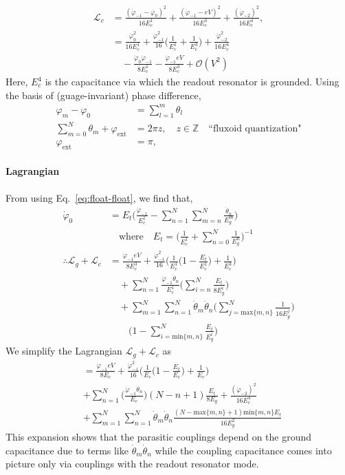 \documentclass[%
reprint,
superscriptaddress,
 amsmath,amssymb,
 aps,
 prx,
longbibliography,
floatfix,
]{revtex4-2}
\begin{document}
\begin{align}
\mathcal{L}_{c}&=\frac{(\dot{\varphi}_{-1}-\dot{\varphi_0})^2}{16E^1_{c}}+\frac{(\dot{\varphi}_{-1}-eV)^2}{16E^3_{c}}+\frac{(\dot{\varphi}_{-2})^2}{16E^4_{c}},\\ &=\frac{\dot{\varphi}^2_0}{16E^1_c}+\frac{\dot{\varphi}^2_{-1}}{16}\Big(\frac{1}{E^1_c}+\frac{1}{E^3_c}\Big)+\frac{\dot{\varphi}^2_{-2}}{16E^4_c}\nonumber\\&\quad-\frac{\dot{\varphi}_0\dot{\varphi}_{-1}}{8E^1_c}-\frac{\dot{\varphi}_{-1}eV}{8E^3_c}+\mathcal{O}(V^2)
\end{align}
Here, $E_c^4$ is the capacitance via which the readout resonator is grounded. Using the basis of (guage-invariant) phase difference, 
\begin{align}
\varphi_m-\varphi_0&=\sum_{l=1}^m\theta_l\\ \sum_{m=0}^N \theta_m+\varphi_\mathrm{ext}&=2\pi z, \quad z\in\mathbb{Z}\quad\text{``fluxoid quantization"}\\
\varphi_\mathrm{ext}&=\pi,    
\end{align}
\paragraph{Lagrangian} 
From using Eq.~\ref{eq:float-float}, we find that, 
\begin{align}
    \dot{\varphi}_0&=E_t\Big(\frac{\dot{\varphi}_{-1}}{E_c^1}-\sum_{n=1}^N\sum_{m=n}^N\frac{\dot{\theta}_n}{E^m_g}\Big)\\&\quad\text{where}\quad E_t=\Big(\frac{1}{E_c^1}+\sum_{n=0}^N\frac{1}{E^n_g}\Big)^{-1}\nonumber\\
\therefore     \mathcal{L}_g+\mathcal{L}_c&=\frac{\dot{\varphi}_{-1}eV}{8E^3_c}+\frac{\dot{\varphi}^2_{-1}}{16}\Big(\frac{1}{E^1_c}\Big(1-\frac{E_t}{E_c^1}\Big)+\frac{1}{E^3_c}\Big)\nonumber\\&\quad+\sum_{n=1}^N\frac{\dot{\varphi}_{-1}\dot{\theta}_n}{E_c^1}\Big(\sum_{i=n}^N\frac{E_t}{8E^i_g}\Big)\nonumber\\&\quad+\sum_{m=1}^N\sum_{n=1}^N\dot{\theta}_m\dot{\theta}_{n}\Big( \sum_{j=\text{max}\{m,n\}}^N\frac{1}{16E_g^j}\Big)\nonumber\\&\quad\quad\Big(1-\sum_{i=\text{min}\{m,n\}}^N\frac{E_t}{E_g^i}\Big)
\end{align}
We simplify the Lagrangian $\mathcal{L}_g+\mathcal{L}_c$ as
\begin{align}
    &=\frac{\dot{\varphi}_{-1}eV}{8E_c}+\frac{\dot{\varphi}^2_{-1}}{16}\Big(\frac{1}{E_c}\Big(1-\frac{E_t}{E_c}\Big)+\frac{1}{E_c}\Big)\nonumber\\&+\sum_{n=1}^N\Big(\frac{\dot{\varphi}_{-1}\dot{\theta}_n}{E_c}\Big)(N-n+1)\frac{E_t}{8E_g}+\frac{(\dot{\varphi}_{-2})^2}{16E^4_{c}}\nonumber\\
&+\sum_{m=1}^N\sum_{n=1}^N\dot{\theta}_m\dot{\theta}_{n} \frac{(N-\text{max}\{m,n\}+1)\text{min}\{m,n\}E_t}{16E_g^2}
\end{align}
This expansion shows that the parasitic couplings depend on the ground capacitance due to terms like $\dot{\theta}_m\dot{\theta}_n$ while the coupling capacitance comes into picture only via couplings with the readout resonator mode. 
\end{document}

